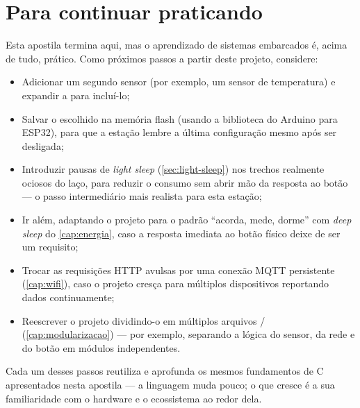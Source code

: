 \section{Para continuar praticando}

Esta apostila termina aqui, mas o aprendizado de sistemas embarcados é, acima de tudo, prático. Como próximos passos a partir deste projeto, considere:

\begin{itemize}
    \item Adicionar um segundo sensor (por exemplo, um sensor de temperatura) e expandir a  para incluí-lo;
    \item Salvar o  escolhido na memória flash (usando a biblioteca  do Arduino para ESP32), para que a estação lembre a última configuração mesmo após ser desligada;
    \item Introduzir pausas de \emph{light sleep} (\cref{sec:light-sleep}) nos trechos realmente ociosos do laço, para reduzir o consumo sem abrir mão da resposta ao botão — o passo intermediário mais realista para esta estação;
    \item Ir além, adaptando o projeto para o padrão ``acorda, mede, dorme'' com \emph{deep sleep} do \cref{cap:energia}, caso a resposta imediata ao botão físico deixe de ser um requisito;
    \item Trocar as requisições HTTP avulsas por uma conexão MQTT persistente (\cref{cap:wifi}), caso o projeto cresça para múltiplos dispositivos reportando dados continuamente;
    \item Reescrever o projeto dividindo-o em múltiplos arquivos / (\cref{cap:modularizacao}) — por exemplo, separando a lógica do sensor, da rede e do botão em módulos independentes.
\end{itemize}

Cada um desses passos reutiliza e aprofunda os mesmos fundamentos de C apresentados nesta apostila — a linguagem muda pouco; o que cresce é a sua familiaridade com o hardware e o ecossistema ao redor dela.
